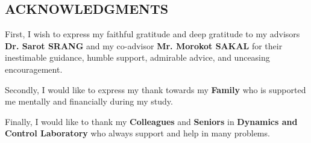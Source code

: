 \begin{center}
	\section*{\centering ACKNOWLEDGMENTS}
\end{center}
\hspace{1.5cm}
First, I wish to express my faithful gratitude and deep gratitude to my advisors \textbf{Dr. Sarot SRANG} and my co-advisor \textbf{Mr. Morokot SAKAL} for their inestimable guidance, humble support, admirable advice, and unceasing encouragement.\par
\hspace{1.27cm}
Secondly, I would like to express my thank towards my \textbf{Family} who is supported me mentally and financially during my study.\par
\hspace{1.27cm}
Finally, I would like to thank my \textbf{Colleagues} and \textbf{Seniors} in \textbf{Dynamics and Control Laboratory} who always support and help in many problems.\par